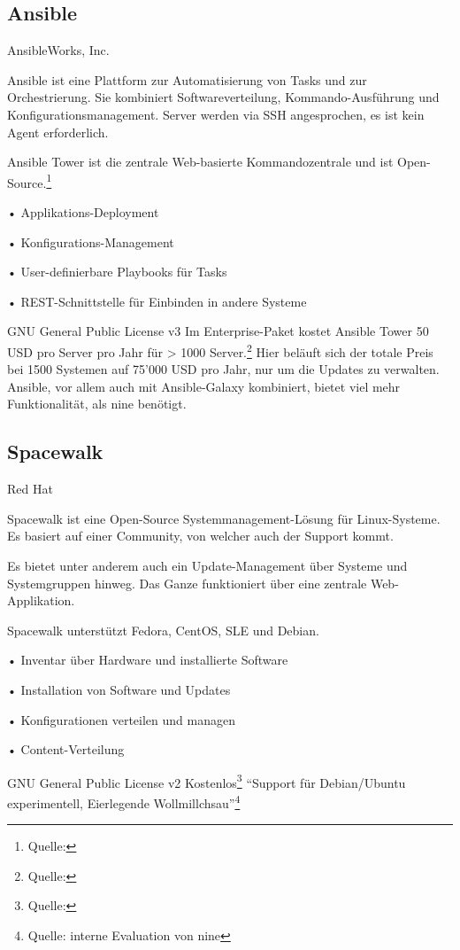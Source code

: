 \clearpage
\subsection*{Ansible}

{AnsibleWorks, Inc.}
{Ansible ist eine Plattform zur Automatisierung von Tasks und zur Orchestrierung. Sie kombiniert Softwareverteilung, Kommando-Ausführung und Konfigurationsmanagement. Server werden via SSH angesprochen, es ist kein Agent erforderlich.

Ansible Tower ist die zentrale Web-basierte Kommandozentrale und ist Open-Source.\footnote{Quelle: }}
{
• Applikations-Deployment

• Konfigurations-Management

• User-definierbare Playbooks für Tasks

• REST-Schnittstelle für Einbinden in andere Systeme
}
{GNU General Public License v3}
{Im Enterprise-Paket kostet Ansible Tower 50 USD pro Server pro Jahr für > 1000 Server.\footnote{Quelle: }}
{}
{Hier beläuft sich der totale Preis bei 1500 Systemen auf 75'000 USD pro Jahr, nur um die Updates zu verwalten. Ansible, vor allem auch mit Ansible-Galaxy kombiniert, bietet viel mehr Funktionalität, als \gls{nine} benötigt.}

\subsection*{Spacewalk} \label{sec:analysis:competition:spacewalk}

{Red Hat}
{Spacewalk ist eine Open-Source Systemmanagement-Lösung für Linux-Systeme. Es basiert auf einer Community, von welcher auch der Support kommt.

Es bietet unter anderem auch ein Update-Management über Systeme und Systemgruppen hinweg. Das Ganze funktioniert über eine zentrale Web-Applikation.

Spacewalk unterstützt Fedora, CentOS, SLE und Debian.}
{
• Inventar über Hardware und installierte Software

• Installation von Software und Updates

• Konfigurationen verteilen und managen

• Content-Verteilung
}
{GNU General Public License v2}
{Kostenlos\footnote{Quelle: }}
{}
{``Support für Debian/Ubuntu experimentell, Eierlegende Wollmillchsau''\footnote{Quelle: interne Evaluation von \gls{nine}}}

